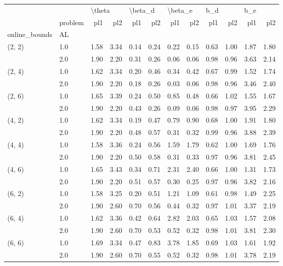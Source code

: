 \begin{tabular}{llrrrrrrrrrr}
\toprule
       & {} & \multicolumn{2}{l}{\textbackslash theta} & \multicolumn{2}{l}{\textbackslash beta\_d} & \multicolumn{2}{l}{\textbackslash beta\_e} & \multicolumn{2}{l}{b\_d} & \multicolumn{2}{l}{b\_e} \\
       & problem &    pl1 &  pl2 &     pl1 &  pl2 &     pl1 &  pl2 &  pl1 &  pl2 &  pl1 &  pl2 \\
online\_bounds & AL &        &      &         &      &         &      &      &      &      &      \\
\midrule
(2, 2) & 1.0 &   1.58 & 3.34 &    0.14 & 0.24 &    0.22 & 0.15 & 0.63 & 1.00 & 1.87 & 1.80 \\
       & 2.0 &   1.90 & 2.20 &    0.31 & 0.26 &    0.06 & 0.06 & 0.98 & 0.96 & 3.63 & 2.14 \\
(2, 4) & 1.0 &   1.62 & 3.34 &    0.20 & 0.46 &    0.34 & 0.42 & 0.67 & 0.99 & 1.52 & 1.74 \\
       & 2.0 &   1.90 & 2.20 &    0.18 & 0.26 &    0.03 & 0.06 & 0.98 & 0.96 & 3.46 & 2.40 \\
(2, 6) & 1.0 &   1.65 & 3.39 &    0.24 & 0.50 &    0.85 & 0.48 & 0.66 & 1.02 & 1.55 & 1.67 \\
       & 2.0 &   1.90 & 2.20 &    0.43 & 0.26 &    0.09 & 0.06 & 0.98 & 0.97 & 3.95 & 2.29 \\
(4, 2) & 1.0 &   1.62 & 3.34 &    0.19 & 0.47 &    0.79 & 0.90 & 0.68 & 1.00 & 1.91 & 1.80 \\
       & 2.0 &   1.90 & 2.20 &    0.48 & 0.57 &    0.31 & 0.32 & 0.99 & 0.96 & 3.88 & 2.39 \\
(4, 4) & 1.0 &   1.58 & 3.36 &    0.24 & 0.56 &    1.59 & 1.79 & 0.62 & 1.00 & 1.69 & 1.76 \\
       & 2.0 &   1.90 & 2.20 &    0.50 & 0.58 &    0.31 & 0.33 & 0.97 & 0.96 & 3.81 & 2.45 \\
(4, 6) & 1.0 &   1.65 & 3.43 &    0.34 & 0.71 &    2.31 & 2.40 & 0.66 & 1.00 & 1.31 & 1.73 \\
       & 2.0 &   1.90 & 2.20 &    0.51 & 0.57 &    0.30 & 0.25 & 0.97 & 0.96 & 3.82 & 2.16 \\
(6, 2) & 1.0 &   1.58 & 3.25 &    0.20 & 0.51 &    1.21 & 1.09 & 0.61 & 0.98 & 1.49 & 2.25 \\
       & 2.0 &   1.90 & 2.60 &    0.70 & 0.56 &    0.44 & 0.32 & 0.97 & 1.01 & 3.37 & 2.19 \\
(6, 4) & 1.0 &   1.62 & 3.36 &    0.42 & 0.64 &    2.82 & 2.03 & 0.65 & 1.03 & 1.57 & 2.08 \\
       & 2.0 &   1.90 & 2.60 &    0.70 & 0.53 &    0.52 & 0.32 & 0.98 & 1.01 & 3.81 & 2.30 \\
(6, 6) & 1.0 &   1.69 & 3.34 &    0.47 & 0.83 &    3.78 & 1.85 & 0.69 & 1.03 & 1.61 & 1.92 \\
       & 2.0 &   1.90 & 2.60 &    0.70 & 0.55 &    0.52 & 0.32 & 0.98 & 1.01 & 3.78 & 2.19 \\
\bottomrule
\end{tabular}
